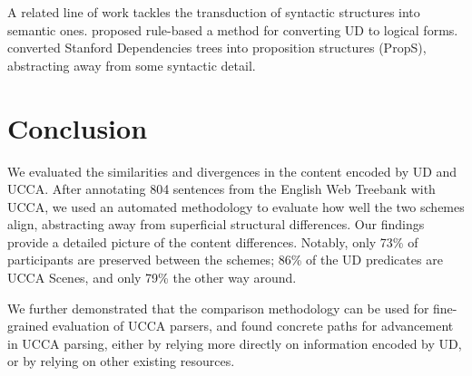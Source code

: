 \documentclass[11pt,a4paper]{article}
\begin{document}
A related line of work tackles the transduction of syntactic structures into semantic ones.
 proposed rule-based a method for converting UD
to logical forms. 
 converted Stanford Dependencies trees into
proposition structures ({\sc PropS}), abstracting away from some syntactic detail.


\section{Conclusion}\label{sec:conclusion}

We evaluated the similarities and divergences in the content encoded by UD and UCCA. 
After annotating 804 sentences from the English Web Treebank with UCCA,
we used an automated methodology to evaluate how well the two schemes align,
abstracting away from superficial structural differences.
Our findings provide a detailed picture of the content differences.
Notably, only 73\% of participants are preserved between the schemes;
86\% of the UD predicates are UCCA Scenes, and only 79\% the other way around.

We further demonstrated that the comparison methodology can be used for fine-grained
evaluation of UCCA parsers, and found concrete paths for advancement in UCCA parsing, either by relying more directly on 
information encoded by UD, or by relying on other existing resources.






\end{document}
